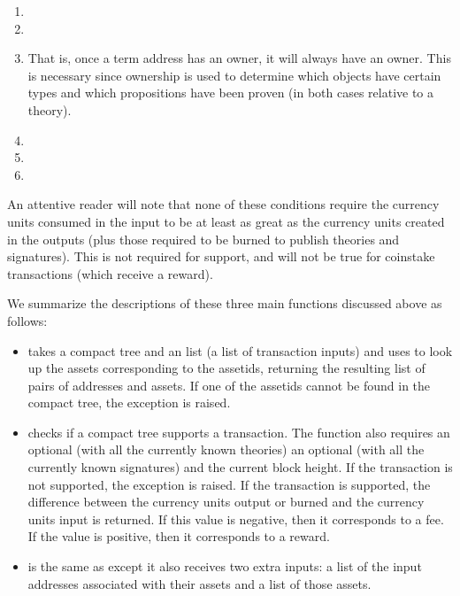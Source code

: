\begin{enumerate}
\item {}

\item {}


\item {}
That is, once a term address has an owner, it will always have an owner.
This is necessary since ownership is used to determine which objects have certain types and which propositions
have been proven (in both cases relative to a theory).
\item {}
\item {}

\item {}

\end{enumerate}
An attentive reader will note that none of these conditions require the currency units consumed
in the input to be at least as great as the currency units created in the outputs (plus those
required to be burned to publish theories and signatures).
This is not required for support,
and will not be true for coinstake transactions (which receive a reward).

We summarize the descriptions of these three main functions discussed above as follows:
\begin{itemize}
\item {} takes a compact tree and an
{} list (a list of transaction inputs)
and uses {} to look up the assets corresponding to
the assetids, returning the resulting list of pairs of addresses and assets.
If one of the assetids cannot be found in the compact tree,
the exception {} is raised.
\item {} checks if a compact tree supports a transaction.
The function also requires an optional {} (with all the currently known theories)
an optional {} (with all the currently known signatures)
and the current block height.
If the transaction is not supported, the exception {} is raised.
If the transaction is supported,
the difference between the currency units output or burned and the currency units input
is returned. If this value is negative, then it corresponds to a fee.
If the value is positive, then it corresponds to a reward.
\item {} is the same as {}
except it also receives two extra inputs:
a list of the input addresses associated with their assets
and a list of those assets.
\end{itemize}

